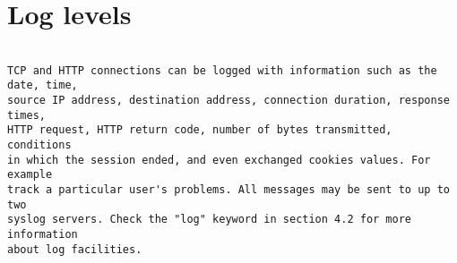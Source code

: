 
\section{Log levels}

\begin{verbatim}

TCP and HTTP connections can be logged with information such as the date, time,
source IP address, destination address, connection duration, response times,
HTTP request, HTTP return code, number of bytes transmitted, conditions
in which the session ended, and even exchanged cookies values. For example
track a particular user's problems. All messages may be sent to up to two
syslog servers. Check the "log" keyword in section 4.2 for more information
about log facilities.


\end{verbatim}
